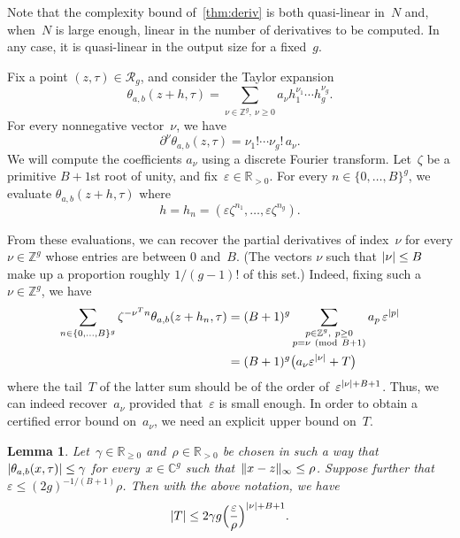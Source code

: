 \documentclass[12pt,oneside]{amsart}
\numberwithin{equation}{section}
\newtheorem{lem}[equation]{Lemma}
\theoremstyle{definition}
\newcommand{\Z}{\mathbb{Z}}
\newcommand{\R}{\mathbb{R}}
\newcommand{\red}{\mathcal{R}}
\newcommand{\C}{\mathbb{C}}
\newcommand{\eps}{\varepsilon}
\DeclarePairedDelimiter{\abs}{|}{|}
\DeclarePairedDelimiter{\paren}{(}{)}
\DeclarePairedDelimiter{\norm}{\|}{\|}
\begin{document}
Note that the complexity bound of~\cref{thm:deriv} is both quasi-linear in~$N$
and, when~$N$ is large enough, linear in the number of derivatives to be computed. In
any case, it is quasi-linear in the output size for a
fixed~$g$.

Fix a point $(z,\tau)\in \red_g$, and consider the Taylor expansion
\begin{equation}
  \label{eq:taylor}
  \theta_{a,b}(z+h,\tau) = \sum_{\nu\in \Z^g,\ \nu\geq 0} a_\nu h_1^{\nu_1}\cdots h_g^{\nu_g}.
\end{equation}
For every nonnegative vector~$\nu$, we have
\begin{equation}
  \label{eq:partial-taylor}
  \partial^\nu\theta_{a,b}(z,\tau) = \nu_1!\cdots\nu_g!\, a_\nu.
\end{equation}
We will compute the coefficients $a_\nu$ using a discrete Fourier
transform. Let~$\zeta$ be a primitive $B+1$st root of
unity, and fix~$\eps\in \R_{>0}$. For every $n\in\{0,\ldots,B\}^g$, we
evaluate $\theta_{a,b}(z+h,\tau)$ where
\begin{equation}
  \label{eq:hn}
  h = h_n = (\eps \zeta^{n_1},\ldots,\eps \zeta^{n_g}).
\end{equation}

From these evaluations, we can recover the partial derivatives of index~$\nu$
for every $\nu\in \Z^g$ whose entries are between $0$ and~$B$. (The vectors
$\nu$ such that $\abs{\nu}\leq B$ make up a proportion roughly $1/(g-1)!$ of
this set.) Indeed, fixing such a $\nu\in \Z^g$, we have
\begin{equation}
  \label{eq:fourier}
  \begin{aligned}
    \sum_{n\in \{0,\ldots,B\}^g} \zeta^{-\nu^Tn} \theta_{a,b}(z + h_n,\tau)
    &= (B+1)^g \sum_{\substack{p\in \Z^g,\ p\geq 0 \\ p = \nu \ (\mathrm{mod}\ B+1)}} a_p\,\eps^{\abs{p}}
    \\
    &= (B+1)^g \paren[\big]{a_\nu \eps^{\abs{\nu}} + T}
  \end{aligned}
\end{equation}
where the tail~$T$ of the latter sum should be of the order
of~$\eps^{\abs{\nu}+B+1}$. Thus, we can indeed recover~$a_\nu$ provided
that~$\eps$ is small enough. In order to obtain a certified error bound
on~$a_\nu$, we need an explicit upper bound on~$T$.

\begin{lem}
  \label{lem:ball-radius}
  Let~$\gamma\in \R_{\geq 0}$ and~$\rho\in \R_{>0}$ be chosen in such a way that
  $\abs{\theta_{a,b}(x,\tau)}\leq \gamma$ for every~$x\in \C^g$ such
  that~$\norm{x-z}_\infty\leq \rho$. Suppose further that
  $\eps\leq (2g)^{-1/(B+1)}\rho$. Then with the above notation, we have
  \begin{displaymath}
    \abs{T}
    \leq 2\gamma g \paren[\Big]{\frac{\eps}{\rho}}^{\abs{\nu}+B+1}.
  \end{displaymath}
\end{lem}
\end{document}
